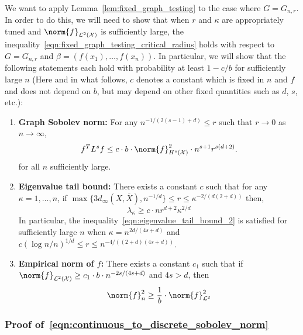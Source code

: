 \documentclass{article}
\newcommand{\1}{\mathbf{1}}
\newcommand{\Xset}{\mathcal{X}}
\newcommand{\Leb}{\mathcal{L}}
\newcommand{\ol}[1]{\overline{#1}}
\theoremstyle{alden}
\theoremstyle{aldenthm}
\theoremstyle{definition}
\theoremstyle{remark}
\begin{document}
We want to apply Lemma~\ref{lem:fixed_graph_testing} to the case where $G = G_{n,r}$. In order to do this, we will need to show that when $r$ and $\kappa$ are appropriately tuned and $\norm{f}_{\Leb^2(\mathcal{X})}$ is sufficiently large, the inequality~\eqref{eqn:fixed_graph_testing_critical_radius} holds with respect to $G = G_{n,r}$ and $\beta = (f(x_1),\ldots,f(x_n))$. In particular, we will show that the following statements each hold with probability at least $1 - c/b$ for sufficiently large $n$ (Here and in what follows, $c$ denotes a constant which is fixed in $n$ and $f$ and does not depend on $b$, but may depend on other fixed quantities such as $d$, $s$, etc.): 
\begin{enumerate}[label=(E\arabic*)]
	\item 
	\label{event:discrete_sobolev_norm}
	\textbf{Graph Sobolev norm:} For any $n^{-1/(2(s - 1) + d)}\leq r$ such that $r \to 0$ as $n \to \infty$,
	\begin{equation}
	\label{eqn:continuous_to_discrete_sobolev_norm}
	f^T L^s f \leq c \cdot b \cdot \norm{f}_{H^s(\Xset)}^2 \cdot n^{s + 1} r^{s(d + 2)}.
	\end{equation}
	for all $n$ sufficiently large.
	\item 
	\label{event:eigenvalue_tail_decay_2}
	\textbf{Eigenvalue tail bound:} There exists a constant $c$ such that for any $\kappa = 1,\ldots,n$, if $\max\{ 3 d_{\infty}(X,\ol{X}),n^{-1/d}\} \leq r \leq \kappa^{-2/(d(2 +d))}$ then,
	\begin{equation}
	\label{eqn:eigenvalue_tail_bound_2}
	\lambda_{\kappa} \geq c \cdot n r^{d + 2} \kappa^{2/d}
	\end{equation}
	In particular, the inequality~\eqref{eqn:eigenvalue_tail_bound_2} is satisfied for sufficiently large $n$ when $\kappa = n^{2d/(4s + d)}$ and $c(\log n/n)^{1/d} \leq r \leq n^{-4/((2+d)(4s + d))}$. 
	\item 
	\label{event:l2_norm_order1}
	\textbf{Empirical norm of $f$:} There exists a constant $c_1$ such that if $\norm{f}_{\Leb^2(\Xset)} \geq c_1 \cdot b \cdot n^{-2s/(4s + d)}$ and $4s > d$, then
	\begin{equation}
	\label{eqn:l2_to_empirical_norm_order1}
	\norm{f}_n^2 \geq \frac{1}{b} \cdot \norm{f}_{\Leb^2}^2
	\end{equation}
\end{enumerate} 

\subsubsection{Proof of~\eqref{eqn:continuous_to_discrete_sobolev_norm}}
\end{document}
